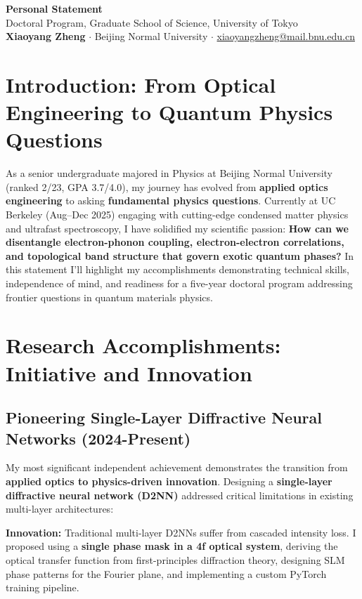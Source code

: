 \documentclass[11pt,a4paper]{article}
\begin{document}
\begin{center}
    {\large \textbf{Personal Statement}}\\[0.2em]
    {\normalsize Doctoral Program, Graduate School of Science, University of Tokyo}\\[0.4em]
    \textbf{Xiaoyang Zheng} $\cdot$ Beijing Normal University $\cdot$ \href{mailto:xiaoyangzheng@mail.bnu.edu.cn}{xiaoyangzheng@mail.bnu.edu.cn}
\end{center}

\vspace{-0.4em}

\section{Introduction: From Optical Engineering to Quantum Physics Questions}

As a senior undergraduate majored in Physics at Beijing Normal University (ranked 2/23, GPA 3.7/4.0), my journey has evolved from \textbf{applied optics engineering} to asking \textbf{fundamental physics questions}. Currently at UC Berkeley (Aug--Dec 2025) engaging with cutting-edge condensed matter physics and ultrafast spectroscopy, I have solidified my scientific passion: \textbf{How can we disentangle electron-phonon coupling, electron-electron correlations, and topological band structure that govern exotic quantum phases?} In this statement I'll highlight my accomplishments demonstrating technical skills, independence of mind, and readiness for a five-year doctoral program addressing frontier questions in quantum materials physics.

\section{Research Accomplishments: Initiative and Innovation}

\subsection{Pioneering Single-Layer Diffractive Neural Networks (2024-Present)}

My most significant independent achievement demonstrates the transition from \textbf{applied optics to physics-driven innovation}. Designing a \textbf{single-layer diffractive neural network (D2NN)} addressed critical limitations in existing multi-layer architectures:

\textbf{Innovation:} Traditional multi-layer D2NNs suffer from cascaded intensity loss. I proposed using a \textbf{single phase mask in a 4f optical system}, deriving the optical transfer function from first-principles diffraction theory, designing SLM phase patterns for the Fourier plane, and implementing a custom PyTorch training pipeline.
\end{document}
